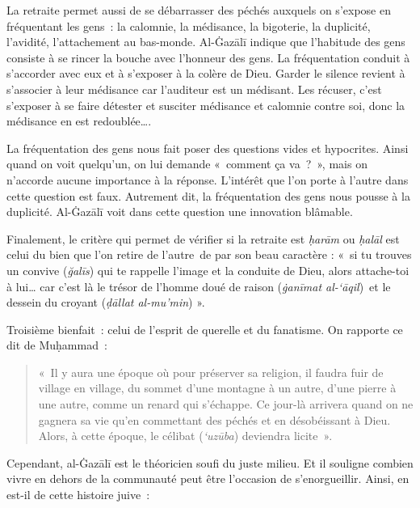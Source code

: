 La retraite permet aussi de se débarrasser des péchés auxquels on
s'expose en fréquentant les gens~: la calomnie, la médisance, la
bigoterie, la duplicité, l'avidité, l'attachement au bas-monde.
Al-Ġazālī \label{theol:AlGazali30} indique que l'habitude des gens consiste à se rincer la bouche
avec l'honneur des gens. La fréquentation conduit à s'accorder avec eux
et à s'exposer à la colère de Dieu. Garder le silence revient à
s'associer à leur médisance car l'auditeur est un médisant. Les récuser,
c'est s'exposer à se faire détester et susciter médisance et calomnie
contre soi, donc la médisance en est redoublée\ldots{}.

La fréquentation des gens nous fait poser des questions vides et
hypocrites. Ainsi quand on voit quelqu'un, on lui demande «~comment ça
va~?~», mais on n'accorde aucune importance à la réponse. L'intérêt que
l'on porte à l'autre dans cette question est faux. Autrement dit, la
fréquentation des gens nous pousse à la duplicité. Al-Ġazālī \label{theol:AlGazali11} voit dans
cette question une innovation blâmable.

Finalement, le critère qui permet de vérifier si la retraite est
\emph{ḥarām} ou \emph{ḥalāl} est celui du bien que l'on retire de
l'autre~de par son beau caractère : «~si tu trouves un convive
(\emph{ğalīs}) qui te rappelle l'image et la conduite de Dieu, alors
attache-toi à lui\ldots{} car c'est là le trésor de l'homme doué de
raison (\emph{ġanīmat al-`āqil})~et le dessein du croyant (\emph{ḍāllat
al-mu'min}) ».

Troisième bienfait~: celui de l'esprit de querelle et du fanatisme. On
rapporte ce dit de Muḥammad~:
\begin{quote}
    «~Il y aura une époque où pour préserver
sa religion, il faudra fuir de village en village, du sommet d'une
montagne à un autre, d'une pierre à une autre, comme un renard qui
s'échappe. Ce jour-là arrivera quand on ne gagnera sa vie qu'en
commettant des péchés et en désobéissant à Dieu. Alors, à cette époque,
le célibat (\emph{`uzūba}) deviendra licite~».
\end{quote}

Cependant, al-Ġazālī est le théoricien soufi du juste milieu. Et il
souligne combien vivre en dehors de la communauté peut être l'occasion
de s'enorgueillir. Ainsi, en est-il de cette histoire juive~:

